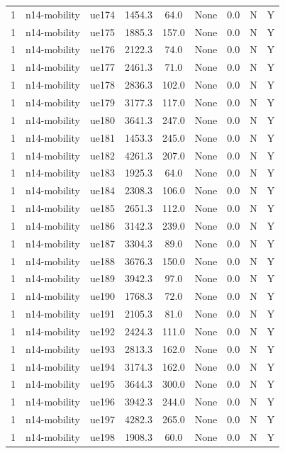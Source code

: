 \begin{table}[ht]
\begin{tabular}{|c|c|c|c|c|c|c|c|c|}
1 & n14-mobility & ue174 & 1454.3 & 64.0 & None & 0.0 & N & Y \\
1 & n14-mobility & ue175 & 1885.3 & 157.0 & None & 0.0 & N & Y \\
1 & n14-mobility & ue176 & 2122.3 & 74.0 & None & 0.0 & N & Y \\
1 & n14-mobility & ue177 & 2461.3 & 71.0 & None & 0.0 & N & Y \\
1 & n14-mobility & ue178 & 2836.3 & 102.0 & None & 0.0 & N & Y \\
1 & n14-mobility & ue179 & 3177.3 & 117.0 & None & 0.0 & N & Y \\
1 & n14-mobility & ue180 & 3641.3 & 247.0 & None & 0.0 & N & Y \\
1 & n14-mobility & ue181 & 1453.3 & 245.0 & None & 0.0 & N & Y \\
1 & n14-mobility & ue182 & 4261.3 & 207.0 & None & 0.0 & N & Y \\
1 & n14-mobility & ue183 & 1925.3 & 64.0 & None & 0.0 & N & Y \\
1 & n14-mobility & ue184 & 2308.3 & 106.0 & None & 0.0 & N & Y \\
1 & n14-mobility & ue185 & 2651.3 & 112.0 & None & 0.0 & N & Y \\
1 & n14-mobility & ue186 & 3142.3 & 239.0 & None & 0.0 & N & Y \\
1 & n14-mobility & ue187 & 3304.3 & 89.0 & None & 0.0 & N & Y \\
1 & n14-mobility & ue188 & 3676.3 & 150.0 & None & 0.0 & N & Y \\
1 & n14-mobility & ue189 & 3942.3 & 97.0 & None & 0.0 & N & Y \\
1 & n14-mobility & ue190 & 1768.3 & 72.0 & None & 0.0 & N & Y \\
1 & n14-mobility & ue191 & 2105.3 & 81.0 & None & 0.0 & N & Y \\
1 & n14-mobility & ue192 & 2424.3 & 111.0 & None & 0.0 & N & Y \\
1 & n14-mobility & ue193 & 2813.3 & 162.0 & None & 0.0 & N & Y \\
1 & n14-mobility & ue194 & 3174.3 & 162.0 & None & 0.0 & N & Y \\
1 & n14-mobility & ue195 & 3644.3 & 300.0 & None & 0.0 & N & Y \\
1 & n14-mobility & ue196 & 3942.3 & 244.0 & None & 0.0 & N & Y \\
1 & n14-mobility & ue197 & 4282.3 & 265.0 & None & 0.0 & N & Y \\
1 & n14-mobility & ue198 & 1908.3 & 60.0 & None & 0.0 & N & Y \\

\end{tabular}
\end{table}
